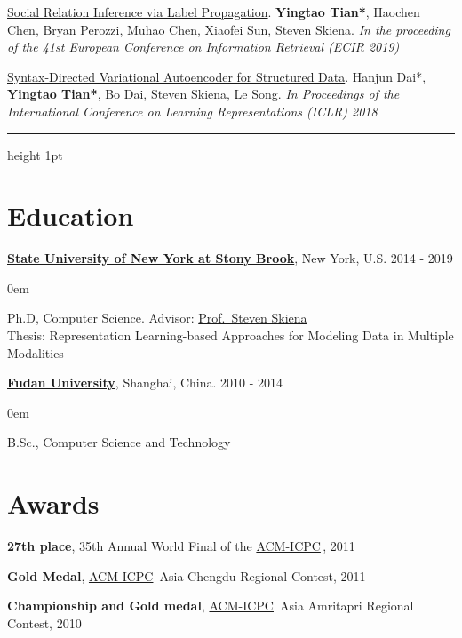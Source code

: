 \documentclass[line,margin]{cv}
\newenvironment{block}
{
  \begin{addmargin}[2em]{0em}%
}
{
  \end{addmargin}
}
\newcommand{\myemph}{\textbf}
\renewcommand{\hrulefill}{%
  \leavevmode\leaders\hrule height 1pt\hfill\kern0pt }
\newcommand{\SUNY}{\href{http://www.stonybrook.edu/}{State University of New York at Stony Brook}}
\newcommand{\Fudan}{\href{http://www.fudan.edu.cn/englishnew/}{Fudan University}}
\newcommand{\Skiena}{\href{https://www3.cs.stonybrook.edu/~skiena/}{Prof.\ Steven Skiena}}
\newcommand{\ICPC}{\href{http://https://icpc.global//}{ACM-ICPC}}
\begin{document}
\begin{resume}
{  \href{http://www.mlgworkshop.org/2018/papers/MLG2018_paper_58.pdf}{Social Relation Inference via Label Propagation}.
  \textbf{Yingtao Tian*}, Haochen Chen, Bryan Perozzi, Muhao Chen, Xiaofei Sun, Steven Skiena. \emph{In the proceeding of the 41st European Conference on Information Retrieval (ECIR 2019)}

  \href{http://www.mlgworkshop.org/2018/papers/MLG2018_paper_58.pdf}{Syntax-Directed Variational Autoencoder for Structured Data}.
  Hanjun Dai*, \textbf{Yingtao Tian*}, Bo Dai, Steven Skiena, Le Song. \emph{In Proceedings of the International Conference on Learning Representations (ICLR) 2018}
  }

  \hrulefill


\section{Education}

  {\bf \SUNY}, New York, U.S. \hfill 2014 - 2019
  \begin{block}
    Ph.D, Computer Science. Advisor: \Skiena{} \\
    Thesis: Representation Learning-based Approaches for Modeling Data in Multiple Modalities
  \end{block}

  {\bf \Fudan}, Shanghai, China. \hfill 2010 - 2014

  \begin{block}
    B.Sc., Computer Science and Technology 
  \end{block}


\section{Awards}
  \myemph{27th place}, 35th Annual World Final of the \ICPC \,, 2011

  \myemph{Gold Medal}, \ICPC\ Asia Chengdu Regional Contest, 2011

  \myemph{Championship and Gold medal}, \ICPC\ Asia Amritapri Regional Contest, 2010

\end{resume}
\end{document}
